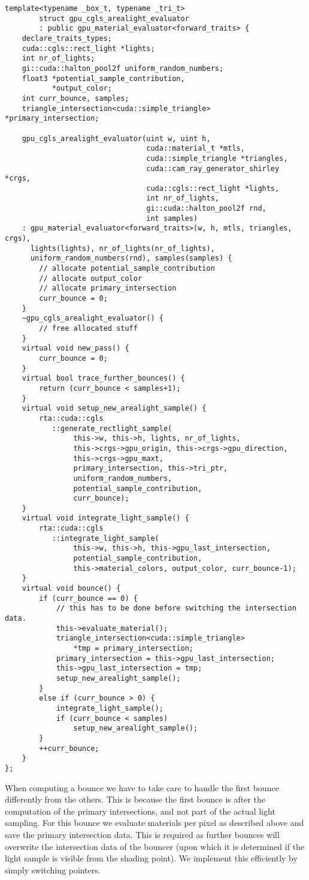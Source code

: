 \documentclass[a4paper,11pt]{scrartcl}
\begin{document}
\begin{lstlisting}
template<typename _box_t, typename _tri_t> 
		struct gpu_cgls_arealight_evaluator 
		: public gpu_material_evaluator<forward_traits> {
	declare_traits_types;
	cuda::cgls::rect_light *lights;
	int nr_of_lights;
	gi::cuda::halton_pool2f uniform_random_numbers;
	float3 *potential_sample_contribution,
	       *output_color; 
	int curr_bounce, samples;
	triangle_intersection<cuda::simple_triangle> *primary_intersection;

	gpu_cgls_arealight_evaluator(uint w, uint h,
	                             cuda::material_t *mtls, 
	                             cuda::simple_triangle *triangles, 
								 cuda::cam_ray_generator_shirley *crgs, 
								 cuda::cgls::rect_light *lights, 
								 int nr_of_lights,
								 gi::cuda::halton_pool2f rnd, 
								 int samples)
	: gpu_material_evaluator<forward_traits>(w, h, mtls, triangles, crgs), 
	  lights(lights), nr_of_lights(nr_of_lights), 
	  uniform_random_numbers(rnd), samples(samples) {
	    // allocate potential_sample_contribution
	    // allocate output_color
	    // allocate primary_intersection
		curr_bounce = 0;
	}
	~gpu_cgls_arealight_evaluator() {
		// free allocated stuff
	}
	virtual void new_pass() {
		curr_bounce = 0;
	}
	virtual bool trace_further_bounces() {
		return (curr_bounce < samples+1);
	}
	virtual void setup_new_arealight_sample() {
		rta::cuda::cgls
		   ::generate_rectlight_sample(
		   		this->w, this->h, lights, nr_of_lights, 
				this->crgs->gpu_origin, this->crgs->gpu_direction, 
				this->crgs->gpu_maxt,
				primary_intersection, this->tri_ptr, 
				uniform_random_numbers, 
				potential_sample_contribution, 
				curr_bounce);
	}
	virtual void integrate_light_sample() {
		rta::cuda::cgls
		   ::integrate_light_sample(
		   		this->w, this->h, this->gpu_last_intersection, 
				potential_sample_contribution,
				this->material_colors, output_color, curr_bounce-1);
	}
	virtual void bounce() {
		if (curr_bounce == 0) {
			// this has to be done before switching the intersection data.
			this->evaluate_material();
			triangle_intersection<cuda::simple_triangle> 
				*tmp = primary_intersection;
			primary_intersection = this->gpu_last_intersection;
			this->gpu_last_intersection = tmp;
			setup_new_arealight_sample();
		}
		else if (curr_bounce > 0) {
			integrate_light_sample();
			if (curr_bounce < samples)
				setup_new_arealight_sample();
		}
		++curr_bounce;
	}
};
\end{lstlisting}
When computing a bounce we have to take care to handle the first bounce differently from the others.
This is because the first bounce is after the computation of the primary intersections, and not part of the actual light sampling.
For this bounce we evaluate materials per pixel as described above and save the primary intersection data.
This is required as further bounces will overwrite the intersection data of the bouncer
	(upon which it is determined if the light sample is visible from the shading point).
We implement this efficiently by simply switching pointers.
\end{document}
